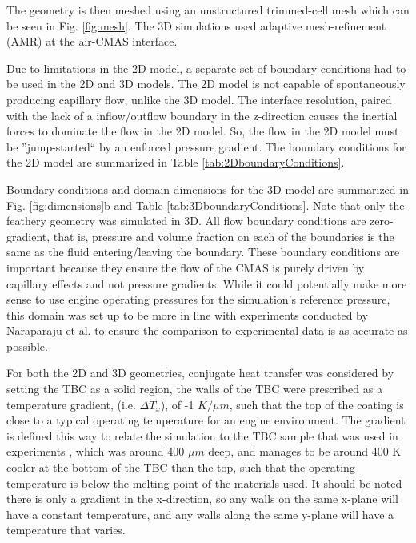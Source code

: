 \documentclass[%
 aip,
 amsmath,amssymb,
 reprint,%
]{revtex4-1}
\begin{document}
The geometry is then meshed using an unstructured trimmed-cell mesh which can be seen in Fig. \ref{fig:mesh}. The 3D simulations used adaptive mesh-refinement (AMR) at the air-CMAS interface. 

Due to limitations in the 2D model, a separate set of boundary conditions had to be used in the 2D and 3D models. The 2D model is not capable of spontaneously producing capillary flow, unlike the 3D model. The interface resolution, paired with the lack of a inflow/outflow boundary in the z-direction causes the inertial forces to dominate the flow in the 2D model. So, the flow in the 2D model must be ''jump-started`` by an enforced pressure gradient. The boundary conditions for the 2D model are summarized in Table \ref{tab:2DboundaryConditions}. 

Boundary conditions and domain dimensions for the 3D model are summarized in Fig. \ref{fig:dimensions}b and Table \ref{tab:3DboundaryConditions}. Note that only the feathery geometry was simulated in 3D. All flow boundary conditions are zero-gradient, that is, pressure and volume fraction on each of the boundaries is the same as the fluid entering/leaving the boundary. These boundary conditions are important because they ensure the flow of the CMAS is purely driven by capillary effects and not pressure gradients. While it could potentially make more sense to use engine operating pressures for the simulation's reference pressure, this domain was set up to be more in line with experiments conducted by Naraparaju et al. \cite{Naraparaju2014, Naraparaju2017, Naraparaju2019} to ensure the comparison to experimental data is as accurate as possible.

For both the 2D and 3D geometries, conjugate heat transfer was considered by setting the TBC as a solid region, the walls of the TBC were prescribed as a temperature gradient, (i.e. $\Delta T_{x}$), of -1 $K/\mu m$, such that the top of the coating is close to a typical operating temperature for an engine environment. The gradient is defined this way to relate the simulation to the TBC sample that was used in experiments \cite{Naraparaju2019}, which was around 400 $\mu m$ deep, and manages to be around 400 K cooler at the bottom of the TBC than the top, such that the operating temperature is below the melting point of the materials used. It should be noted there is only a gradient in the x-direction, so any walls on the same x-plane will have a constant temperature, and any walls along the same y-plane will have a temperature that varies. 
\end{document}
